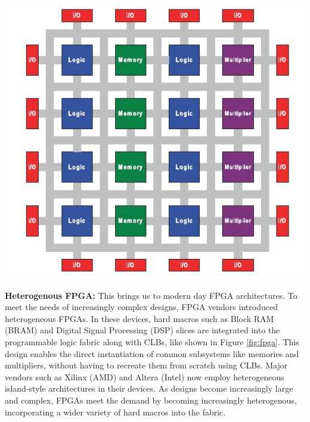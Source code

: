 {
    \centering
    \includegraphics[width=\columnwidth]{figures/heterogenous_fpga_3.jpg}
    \label{fig:homogen_fpga}
}
\vspace{0.25cm}

\textbf{Heterogenous FPGA:} \quad 
This brings us to modern day FPGA architectures. 
To meet the needs of increasingly complex designs, FPGA vendors introduced heterogeneous FPGAs. 
In these devices, hard macros such as Block RAM (BRAM) and Digital Signal Processing (DSP) slices are integrated into the programmable logic fabric along with CLBs, like shown in Figure \ref{fig:fpga}. 
This design enables the direct instantiation of common subsystems like memories and multipliers, without having to recreate them from scratch using CLBs. 
Major vendors such as Xilinx (AMD) and Altera (Intel) now employ heterogeneous island-style architectures in their devices. 
As designs become increasingly large and complex, FPGAs meet the demand by becoming increasingly heterogenous, incorporating a wider variety of hard macros into the fabric. 

